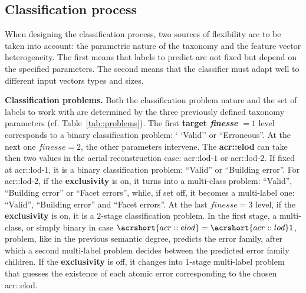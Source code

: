 \documentclass[runningheads]{llncs}
\begin{document}
\subsection{Classification process}

When designing the classification process, two sources of flexibility are to be taken into account: the parametric nature of the taxonomy and the feature vector heterogeneity. The first means that labels to predict are not fixed but depend on the specified parameters. The second means that the classifier must adapt well to different input vectors types and sizes.

\noindent
\textbf{Classification problems.}
Both the classification problem nature and the set of labels to work with are determined by the three previously defined taxonomy parameters (cf. Table~\ref{tab::problems}). The first \textbf{target \textit{finesse}} $= 1$ level corresponds to a binary classification problem: ` `Valid'' or ``Erroneous''. At the next one $\textit{finesse}=2$, the other parameters intervene. The \textbf{\acrshort{acr::elod}} can take then two values in the aerial reconstruction case: \acrshort{acr::lod}-$1$ or \acrshort{acr::lod}-$2$. If fixed at \acrshort{acr::lod}-$1$, it is a binary classification problem: ``Valid'' or ``Building error''. For \acrshort{acr::lod}-$2$, if the \textbf{exclusivity} is on, it turns into a multi-class problem: ``Valid'', ``Building error'' or ``Facet errors'', while, if set off, it becomes a multi-label one: ``Valid'', ``Building error'' and ``Facet errors''. At the last $\textit{finesse}=3$ level, if the \textbf{exclusivity} is on, it is a $2$-stage classification problem. In the first stage, a multi-class, or simply binary in case $\acrshort{acr::elod} = \acrshort{acr::lod}1$, problem, like in the previous semantic degree, predicts the error family, after which a second multi-label problem decides between the predicted error family children. If the \textbf{exclusivity} is off, it changes into  $1$-stage multi-label problem that guesses the existence of each atomic error corresponding to the chosen \acrshort{acr::elod}.
\end{document}
